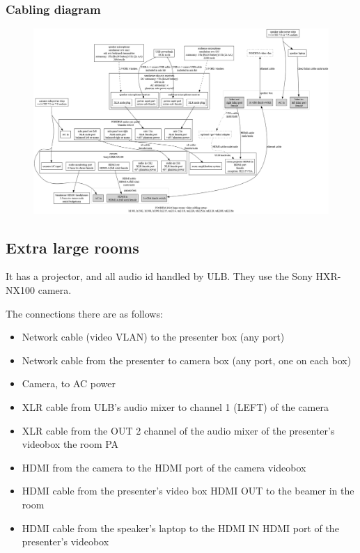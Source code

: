 \documentclass{article}
\begin{document}
\subsubsection{Cabling diagram}
\begin{figure}[H]
  \begin{sideways}
  \centering
  \includegraphics[width = 200mm]{../../graph/cabling_large_rooms.png}
  \end{sideways}
\end{figure}

\subsection{Extra large rooms}
It has a projector, and all audio id handled by ULB. They use the Sony HXR-NX100 camera.

The connections there are as follows:

\begin{itemize}
  \item Network cable (video VLAN) to the presenter box (any port)
  \item Network cable from the presenter to camera box (any port, one on each box)
  \item Camera, to AC power
  \item XLR cable from ULB's audio mixer to channel 1 (LEFT) of the camera
  \item XLR cable from the OUT 2 channel of the audio mixer of the presenter's videobox the room PA
  \item HDMI from the camera to the HDMI port of the camera videobox
  \item HDMI cable from the presenter's video box HDMI OUT to the beamer in the room
  \item HDMI cable from the speaker's laptop to the HDMI IN HDMI port of the presenter's videobox
\end{itemize}
\end{document}
